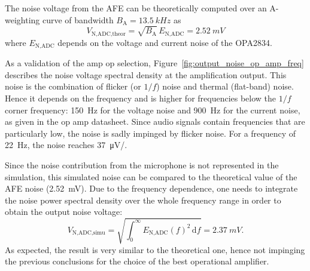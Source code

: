 \documentclass{EPL-master-thesis-covers-EN}
\newcommand{\te}[1]{\textrm{#1}}
\begin{document}
\begin{table}[H]
\centering
{}
\caption{Characteristics of the selected operational amplifier: OPA2834}
\label{tab:selected_op_amp}
\end{table}

The noise voltage from the AFE can be theoretically computed over an A-weighting curve of bandwidth $B_\te{A} = \SI{13.5}{kHz}$ as
\[
 V_\te{N,ADC,theor} = \sqrt{B_\te{A}} \, E_\te{N,ADC} = \SI{2.52}{mV}
\]
where $E_\te{N,ADC}$ depends on the voltage and current noise of the OPA2834.

As a validation of the amp op selection, Figure~\ref{fig:output_noise_op_amp_freq} describes the noise voltage spectral density at the amplification output. 
This noise is the combination of flicker (or $1/f$) noise and thermal (flat-band) noise. Hence it depends on the frequency and is higher for frequencies below the $1/f$ corner frequency: \SI{150}{Hz} for the voltage noise and \SI{900}{Hz} for the current noise, as given in the op amp datasheet. Since audio signals contain frequencies that are particularly low, the noise is sadly impinged by flicker noise. For a frequency of \SI{22}{Hz}, the noise reaches \SI{37}{\micro V/}.

Since the noise contribution from the microphone is not represented in the simulation, this simulated noise can be compared to the theoretical value of the AFE noise (\SI{2.52}{mV}). Due to the frequency dependence, one needs to integrate the noise power spectral density over the whole frequency range in order to obtain the output noise voltage:
\[
 V_\te{N,ADC,simu} = \sqrt{\int_{0}^{\infty} E_\te{N,ADC}(f)^2 \, \te{d}f} = \SI{2.37}{mV}.
\]
As expected, the result is very similar to the theoretical one, hence not impinging the previous conclusions for the choice of the best operational amplifier.
\end{document}
